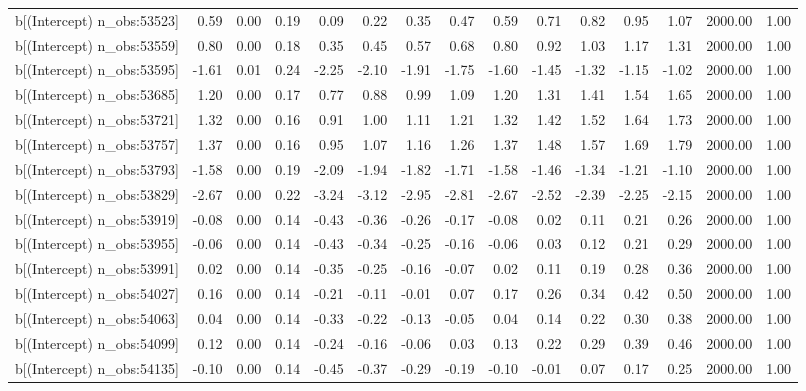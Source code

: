 \begin{table}[ht]
\begin{tabular}{rrrrrrrrrrrrrrr}
  b[(Intercept) n\_obs:53523] & 0.59 & 0.00 & 0.19 & 0.09 & 0.22 & 0.35 & 0.47 & 0.59 & 0.71 & 0.82 & 0.95 & 1.07 & 2000.00 & 1.00 \\ 
  b[(Intercept) n\_obs:53559] & 0.80 & 0.00 & 0.18 & 0.35 & 0.45 & 0.57 & 0.68 & 0.80 & 0.92 & 1.03 & 1.17 & 1.31 & 2000.00 & 1.00 \\ 
  b[(Intercept) n\_obs:53595] & -1.61 & 0.01 & 0.24 & -2.25 & -2.10 & -1.91 & -1.75 & -1.60 & -1.45 & -1.32 & -1.15 & -1.02 & 2000.00 & 1.00 \\ 
  b[(Intercept) n\_obs:53685] & 1.20 & 0.00 & 0.17 & 0.77 & 0.88 & 0.99 & 1.09 & 1.20 & 1.31 & 1.41 & 1.54 & 1.65 & 2000.00 & 1.00 \\ 
  b[(Intercept) n\_obs:53721] & 1.32 & 0.00 & 0.16 & 0.91 & 1.00 & 1.11 & 1.21 & 1.32 & 1.42 & 1.52 & 1.64 & 1.73 & 2000.00 & 1.00 \\ 
  b[(Intercept) n\_obs:53757] & 1.37 & 0.00 & 0.16 & 0.95 & 1.07 & 1.16 & 1.26 & 1.37 & 1.48 & 1.57 & 1.69 & 1.79 & 2000.00 & 1.00 \\ 
  b[(Intercept) n\_obs:53793] & -1.58 & 0.00 & 0.19 & -2.09 & -1.94 & -1.82 & -1.71 & -1.58 & -1.46 & -1.34 & -1.21 & -1.10 & 2000.00 & 1.00 \\ 
  b[(Intercept) n\_obs:53829] & -2.67 & 0.00 & 0.22 & -3.24 & -3.12 & -2.95 & -2.81 & -2.67 & -2.52 & -2.39 & -2.25 & -2.15 & 2000.00 & 1.00 \\ 
  b[(Intercept) n\_obs:53919] & -0.08 & 0.00 & 0.14 & -0.43 & -0.36 & -0.26 & -0.17 & -0.08 & 0.02 & 0.11 & 0.21 & 0.26 & 2000.00 & 1.00 \\ 
  b[(Intercept) n\_obs:53955] & -0.06 & 0.00 & 0.14 & -0.43 & -0.34 & -0.25 & -0.16 & -0.06 & 0.03 & 0.12 & 0.21 & 0.29 & 2000.00 & 1.00 \\ 
  b[(Intercept) n\_obs:53991] & 0.02 & 0.00 & 0.14 & -0.35 & -0.25 & -0.16 & -0.07 & 0.02 & 0.11 & 0.19 & 0.28 & 0.36 & 2000.00 & 1.00 \\ 
  b[(Intercept) n\_obs:54027] & 0.16 & 0.00 & 0.14 & -0.21 & -0.11 & -0.01 & 0.07 & 0.17 & 0.26 & 0.34 & 0.42 & 0.50 & 2000.00 & 1.00 \\ 
  b[(Intercept) n\_obs:54063] & 0.04 & 0.00 & 0.14 & -0.33 & -0.22 & -0.13 & -0.05 & 0.04 & 0.14 & 0.22 & 0.30 & 0.38 & 2000.00 & 1.00 \\ 
  b[(Intercept) n\_obs:54099] & 0.12 & 0.00 & 0.14 & -0.24 & -0.16 & -0.06 & 0.03 & 0.13 & 0.22 & 0.29 & 0.39 & 0.46 & 2000.00 & 1.00 \\ 
  b[(Intercept) n\_obs:54135] & -0.10 & 0.00 & 0.14 & -0.45 & -0.37 & -0.29 & -0.19 & -0.10 & -0.01 & 0.07 & 0.17 & 0.25 & 2000.00 & 1.00 \\ 

\end{tabular}
\end{table}
